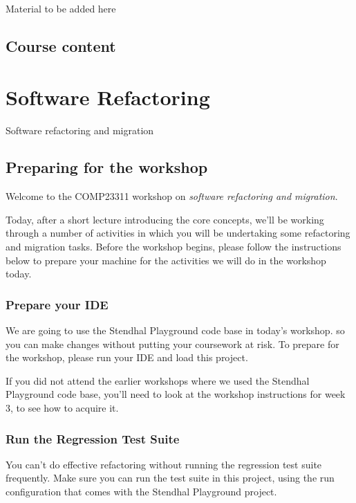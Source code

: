 \documentclass[
]{book}
\begin{document}
Material to be added here

\hypertarget{course-content-2}{%
\section{Course content}\label{course-content-2}}

\hypertarget{refactoring}{%
\chapter{Software Refactoring}\label{refactoring}}

Software refactoring and migration

\hypertarget{gitprep}{%
\section{Preparing for the workshop}\label{gitprep}}

Welcome to the COMP23311 workshop on \emph{software refactoring and migration}.

Today, after a short lecture introducing the core concepts, we'll be working through a number of activities in which you will be undertaking some refactoring and migration tasks. Before the workshop begins, please follow the instructions below to prepare your machine for the activities we will do in the workshop today.

\hypertarget{prepide}{%
\subsection{Prepare your IDE}\label{prepide}}

We are going to use the Stendhal Playground code base in today's workshop. so you can make changes without putting your coursework at risk. To prepare for the workshop, please run your IDE and load this project.

If you did not attend the earlier workshops where we used the Stendhal Playground code base, you'll need to look at the workshop instructions for week 3, to see how to acquire it.

\hypertarget{testsuite}{%
\subsection{Run the Regression Test Suite}\label{testsuite}}

You can't do effective refactoring without running the regression test suite frequently. Make sure you can run the test suite in this project, using the run configuration that comes with the Stendhal Playground project.
\end{document}

